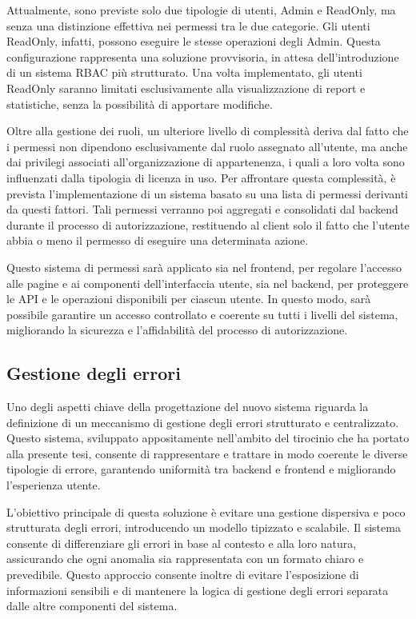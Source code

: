 Attualmente, sono previste solo due tipologie di utenti, Admin e ReadOnly, ma senza una distinzione effettiva nei permessi tra le due categorie. Gli utenti ReadOnly, infatti, possono eseguire le stesse operazioni degli Admin. Questa configurazione rappresenta una soluzione provvisoria, in attesa dell'introduzione di un sistema RBAC più strutturato. Una volta implementato, gli utenti ReadOnly saranno limitati esclusivamente alla visualizzazione di report e statistiche, senza la possibilità di apportare modifiche.

Oltre alla gestione dei ruoli, un ulteriore livello di complessità deriva dal fatto che i permessi non dipendono esclusivamente dal ruolo assegnato all'utente, ma anche dai privilegi associati all’organizzazione di appartenenza, i quali a loro volta sono influenzati dalla tipologia di licenza in uso. Per affrontare questa complessità, è prevista l'implementazione di un sistema basato su una lista di permessi derivanti da questi fattori. Tali permessi verranno poi aggregati e consolidati dal backend durante il processo di autorizzazione, restituendo al client solo il fatto che l'utente abbia o meno il permesso di eseguire una determinata azione.

Questo sistema di permessi sarà applicato sia nel frontend, per regolare l'accesso alle pagine e ai componenti dell'interfaccia utente, sia nel backend, per proteggere le API e le operazioni disponibili per ciascun utente. In questo modo, sarà possibile garantire un accesso controllato e coerente su tutti i livelli del sistema, migliorando la sicurezza e l’affidabilità del processo di autorizzazione.

\subsection{Gestione degli errori}
Uno degli aspetti chiave della progettazione del nuovo sistema riguarda la definizione di un meccanismo di gestione degli errori strutturato e centralizzato. Questo sistema, sviluppato appositamente nell’ambito del tirocinio che ha portato alla presente tesi, consente di rappresentare e trattare in modo coerente le diverse tipologie di errore, garantendo uniformità tra backend e frontend e migliorando l’esperienza utente.

L'obiettivo principale di questa soluzione è evitare una gestione dispersiva e poco strutturata degli errori, introducendo un modello tipizzato e scalabile. Il sistema consente di differenziare gli errori in base al contesto e alla loro natura, assicurando che ogni anomalia sia rappresentata con un formato chiaro e prevedibile. Questo approccio consente inoltre di evitare l'esposizione di informazioni sensibili e di mantenere la logica di gestione degli errori separata dalle altre componenti del sistema.

